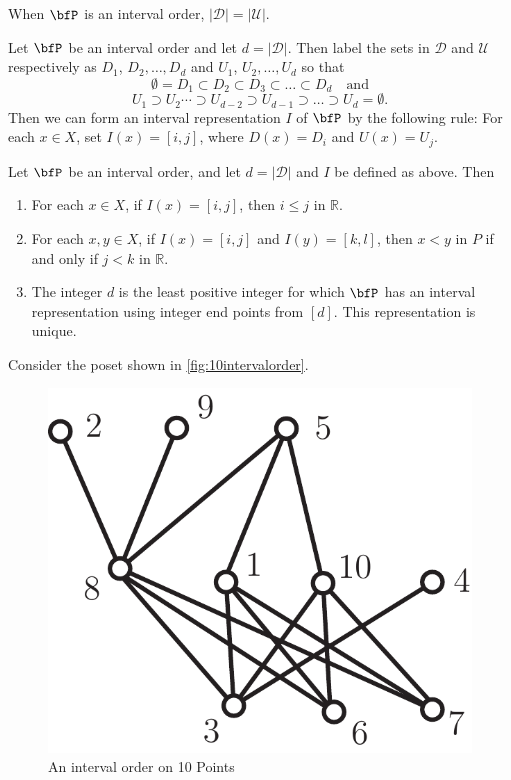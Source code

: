 \begin{proposition}\label{prop:intord-up=down}
When $\bfP$ is an interval order,
$|\mathcal{D}|=|\mathcal{U}|$.
\end{proposition}

Let $\bfP$ be an interval order and let $d=|\mathcal{D}|$.
Then label the sets in $\mathcal{D}$ and $\mathcal{U}$ respectively as
$D_1$, $D_2,\dots,D_d$ and $U_1$, $U_2,\dots,U_d$ 
so that
\[
\emptyset= D_1\subset D_2\subset D_3\subset\dots\subset D_d
 \quad\text{and}
\]
\[
U_1\supset U_{2}\cdots \supset U_{d-2}\supset U_{d-1}\supset\dots\supset U_d
 =\emptyset.
\]
Then we can form an interval representation $I$ of $\bfP$ by the
following rule:  For each $x\in X$, set $I(x)=[i,j]$, where
$D(x)=D_i$ and $U(x)=U_j$.

\begin{proposition}\label{prop:intord-minrep}
Let $\bfP$ be an interval order, and let $d=|\mathcal{D}|$
and $I$ be defined as above.  Then
\begin{enumerate}
\item For each $x\in X$, if $I(x)=[i,j]$, then $i\le j$ in $\mathbb{R}$.
\item For each $x,y\in X$, if $I(x)=[i,j]$ and $I(y)=[k,l]$, then
$x<y$ in $P$ if and only if $j<k$ in $\mathbb{R}$.
\item The integer $d$ is the least positive integer for which
$\bfP$ has an interval representation using integer end points
from $[d]$.  This representation is unique.
\end{enumerate}
\end{proposition}

Consider the poset shown in \autoref{fig:10intervalorder}.

\begin{figure}
\begin{center}
\includegraphics*[scale=.4]{posets-figs/wttfig-12}
\caption{An interval order on 10 Points}
\label{fig:10intervalorder} 
\end{center}
\end{figure}

